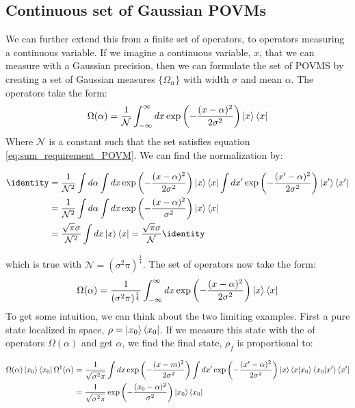 \subsection{Continuous set of Gaussian POVMs}
We can further extend this from a finite set of operators, to operators measuring a continuous variable. If we imagine a continuous variable, $x$, that we can measure with a Gaussian precision, then we can formulate the set of POVMS by creating a set of Gaussian measures $\{\Omega_\alpha\}$ with width $\sigma$ and mean $\alpha$. The operators take the form:
\begin{equation}
    \Omega(\alpha) = \frac{1}{\mathcal{N}}\int_{-\infty}^\infty dx \exp\left(-\frac{(x- \alpha)^2}{2\sigma^2}\right)\ket{x}\bra{x}
\end{equation}
Where $\mathcal{N}$ is a constant such that the set satisfies equation \ref{eq:sum_requirement_POVM}. We can find the normalization by:
\begin{fullwidth}
\begin{align*}
    \identity &= \frac{1}{\mathcal{N}^2}\int d\alpha \int dx \exp\left(-\frac{(x- \alpha)^2}{2\sigma^2}\right)\ket{x}\bra{x}\int dx' \exp\left(-\frac{(x'- \alpha)^2}{2\sigma^2}\right)\ket{x'}\bra{x'} \\
              &= \frac{1}{\mathcal{N}^2}\int d\alpha \int dx \exp\left(-\frac{(x- \alpha)^2}{\sigma^2}\right)\ket{x}\bra{x} \\
              &= \frac{\sqrt{\pi}\sigma }{\mathcal{N}^2} \int dx \ket{x}\bra{x} = \frac{\sqrt{\pi}\sigma }{\mathcal{N}} \identity 
\end{align*}
\end{fullwidth}
which is true with $\mathcal{N}=(\sigma^2 \pi)^\frac14$. The set of operators now take the form:
\begin{equation}
    \Omega(\alpha) = \frac{1}{(\sigma^2 \pi)^\frac14}\int_{-\infty}^\infty dx \exp\left(-\frac{(x- \alpha)^2}{2\sigma^2}\right)\ket{x}\bra{x}
\end{equation}
To get some intuition, we can think about the two limiting examples. First a pure state localized in space, $\rho = \ket{x_0}\bra{x_0}$. If we measure this state with the of operators $\Omega(\alpha)$ and get $\alpha$, we find the final state, $\rho_f$ is proportional to:
\begin{fullwidth}
\begin{align}
    \Omega(\alpha) \ket{x_0}\bra{x_0}  \Omega^\dagger(\alpha) &= \frac{1}{\sqrt{\sigma^2\pi}}\int dx \exp\left(-\frac{(x- m)^2}{2\sigma^2}\right)\int dx' \exp\left(-\frac{(x'- \alpha)^2}{2\sigma^2}\right)\ket{x}\bra{x}\ket{x_0}\bra{x_0}\ket{x'}\bra{x'} \nonumber \\
    &= \frac{1}{\sqrt{\sigma^2\pi}}\exp\left(-\frac{(x_0- \alpha)^2}{\sigma^2}\right)\ket{x_0}\bra{x_0}
\end{align}
\end{fullwidth}
